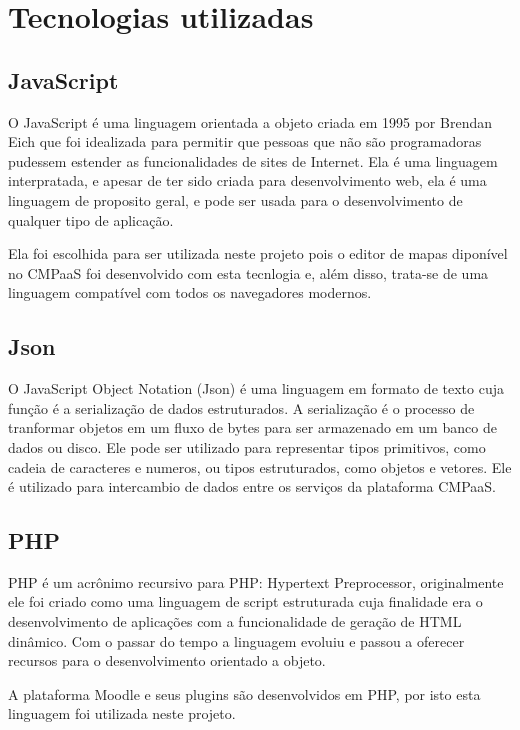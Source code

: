 \documentclass[
	12pt,				%
	openright,			%
	oneside,			%
	a4paper,			%
	english,			%
	french,				%
	spanish,			%
	brazil				%
	]{abntex2}
\begin{document}
\chapter{Tecnologias utilizadas}

\section{JavaScript}

O JavaScript é uma linguagem orientada a objeto criada em 1995 por Brendan Eich que foi idealizada para permitir que pessoas que não são programadoras pudessem estender as funcionalidades de sites de Internet\cite{Richards2010}. Ela é uma linguagem interpratada, e apesar de ter sido criada para desenvolvimento web, ela é uma linguagem de proposito geral, e pode ser usada para o desenvolvimento de qualquer tipo de aplicação\cite{flanagan2006}.

Ela foi escolhida para ser utilizada neste projeto pois o editor de mapas diponível no CMPaaS foi desenvolvido com esta tecnlogia e, além disso, trata-se de uma linguagem compatível com todos os navegadores modernos.  

\section{Json}

O JavaScript Object Notation (Json) é uma linguagem em formato de texto cuja função é a serialização de dados estruturados. A serialização é o processo de tranformar objetos em um fluxo de bytes para ser armazenado em um banco de dados ou disco. Ele pode ser utilizado para representar tipos primitivos, como cadeia de caracteres e numeros, ou tipos estruturados, como objetos e vetores\cite{crockford2006}. Ele é utilizado para intercambio de dados entre os serviços da plataforma CMPaaS.  

\section{PHP}
PHP é um acrônimo recursivo para PHP: Hypertext Preprocessor, originalmente ele foi criado como uma linguagem de script estruturada cuja finalidade era o desenvolvimento de aplicações com a funcionalidade de geração de HTML dinâmico. Com o passar do tempo a linguagem evoluiu e passou a oferecer recursos para o desenvolvimento orientado a objeto\cite{minetto2007}.

A plataforma Moodle e seus plugins são desenvolvidos em PHP, por isto esta linguagem foi utilizada neste projeto. 
\end{document}
